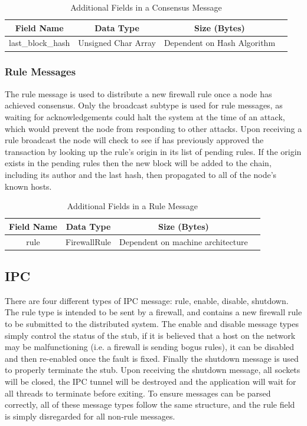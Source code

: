 \documentclass[a4paper, 11pt]{report}
\begin{document}
\begin{table}[H]
\centering
\begin{tabular}{ |c|c|c|c| } 
\hline
Field Name & Data Type & Size (Bytes) \\
\hline
last_block_hash & Unsigned Char Array & Dependent on Hash Algorithm \\ 
\hline
\end{tabular}
\caption{Additional Fields in a Consensus Message}
\label{tab:consensus}
\end{table}

\subsubsection{Rule Messages}
The rule message is used to distribute a new firewall rule once a node has achieved consensus. Only the broadcast subtype is used for rule messages, as waiting for acknowledgements could halt the system at the time of an attack, which would prevent the node from responding to other attacks. Upon receiving a rule broadcast the node will check to see if has previously approved the transaction by looking up the rule's origin in its list of pending rules. If the origin exists in the pending rules then the new block will be added to the chain, including its author and the last hash, then propagated to all of the node's known hosts.

\begin{table}[H]
\centering
\begin{tabular}{ |c|c|c|c| } 
\hline
Field Name & Data Type & Size (Bytes) \\
\hline
rule & FirewallRule & Dependent on machine architecture \\ 
\hline
\end{tabular}
\caption{Additional Fields in a Rule Message}
\label{tab:rule}
\end{table}

\subsection{IPC}
There are four different types of \acrshort{IPC} message: rule, enable, disable, shutdown. The rule type is intended to be sent by a firewall, and contains a new firewall rule to be submitted to the distributed system. The enable and disable message types simply control the status of the stub, if it is believed that a host on the network may be malfunctioning (i.e. a firewall is sending bogus rules), it can be disabled and then re-enabled once the fault is fixed. Finally the shutdown message is used to properly terminate the \gls{stub}. Upon receiving the shutdown message, all sockets will be closed, the \acrshort{IPC} tunnel will be destroyed and the application will wait for all threads to terminate before exiting.
To ensure messages can be parsed correctly, all of these message types follow the same structure, and the rule field is simply disregarded for all non-rule messages.
\end{document}
